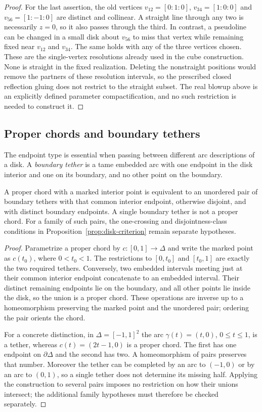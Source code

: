 \begin{proof}
For the last assertion, the old vertices
$v_{12}=[0:1:0]$, $v_{34}=[1:0:0]$ and $v_{56}=[1:-1:0]$
are distinct and collinear. A straight line through any two is
necessarily $z=0$, so it also passes through the third.
In contrast, a pseudoline can be changed in a small disk about
$v_{56}$ to miss that vertex while remaining fixed near
$v_{12}$ and $v_{34}$. The same holds with any of the three
vertices chosen. These are the single-vertex resolutions already
used in the cube construction. None is straight in the fixed
realization. Deleting the nonstraight positions would remove the
partners of these resolution intervals, so the prescribed closed
reflection gluing does not restrict to the straight subset.
The real blowup above is an explicitly defined parameter
compactification, and no such restriction is needed to construct it.
\end{proof}

\subsection{Proper chords and boundary tethers}
The endpoint type is essential when passing between different arc
descriptions of a disk. A \emph{boundary tether} is a tame embedded
arc with one endpoint in the disk interior and one on its boundary,
and no other point on the boundary.

\begin{proposition}
\label{prop:tether}
A proper chord with a marked interior point is equivalent to an
unordered pair of boundary tethers with that common interior endpoint,
otherwise disjoint, and with distinct boundary endpoints. A single
boundary tether is not a proper chord. For a family of such pairs,
the one-crossing and disjointness-class conditions in
Proposition~\ref{prop:disk-criterion} remain separate hypotheses.
\end{proposition}
\begin{proof}
Parametrize a proper chord by $c:[0,1]\longrightarrow\Delta$ and
write the marked point as $c(t_0)$, where $0<t_0<1$. The restrictions
to $[0,t_0]$ and $[t_0,1]$ are exactly the two required tethers.
Conversely, two embedded intervals meeting just at their common
interior endpoint concatenate to an embedded interval. Their distinct
remaining endpoints lie on the boundary, and all other points lie
inside the disk, so the union is a proper chord. These operations
are inverse up to a homeomorphism preserving the marked point and
the unordered pair; ordering the pair orients the chord.

For a concrete distinction, in $\Delta=[-1,1]^2$ the arc
$\gamma(t)=(t,0)$, $0\leq t\leq1$, is a tether, whereas
$c(t)=(2t-1,0)$ is a proper chord. The first has one endpoint on
$\partial\Delta$ and the second has two. A homeomorphism of pairs
preserves that number. Moreover the tether can be completed by an
arc to $(-1,0)$ or by an arc to $(0,1)$, so a single tether does not
determine its missing half. Applying the construction to several
pairs imposes no restriction on how their unions intersect; the
additional family hypotheses must therefore be checked separately.
\end{proof}
